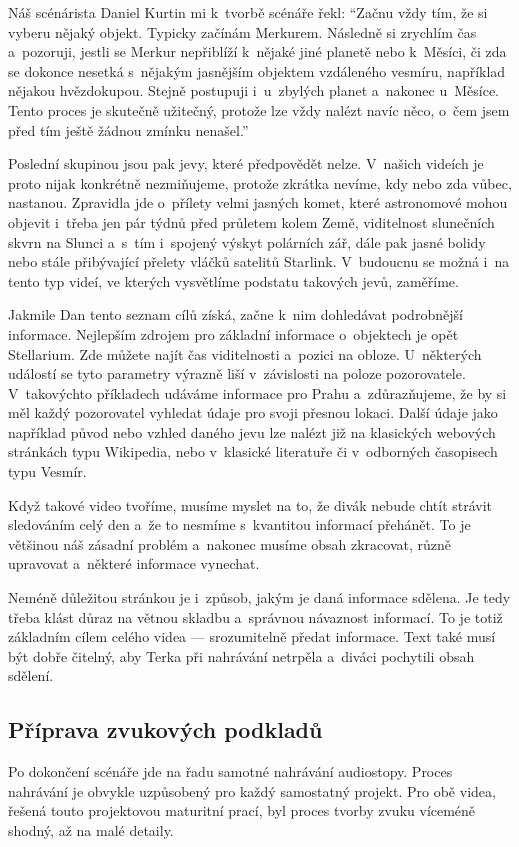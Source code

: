 \documentclass[12pt,a4paper,titlepage]{article}
\begin{document}
Náš scénárista Daniel Kurtin mi k~tvorbě scénáře řekl: \enquote{Začnu vždy tím, že si vyberu nějaký objekt. Typicky začínám Merkurem. Následně si zrychlím čas a~pozoruji, jestli se Merkur nepřiblíží k~nějaké jiné planetě nebo k~Měsíci, či zda se dokonce nesetká s~nějakým jasnějším objektem vzdáleného vesmíru, například nějakou hvězdokupou. Stejně postupuji i~u~zbylých planet a~nakonec u~Měsíce. Tento proces je skutečně užitečný, protože lze vždy nalézt navíc něco, o~čem jsem před tím ještě žádnou zmínku nenašel.}

Poslední skupinou jsou pak jevy, které předpovědět nelze. V~našich videích je proto nijak konkrétně nezmiňujeme, protože zkrátka nevíme, kdy nebo zda vůbec, nastanou. Zpravidla jde o~přílety velmi jasných komet, které astronomové mohou objevit i~třeba jen pár týdnů před průletem kolem Země,  viditelnost slunečních skvrn na Slunci a~s~tím i~spojený výskyt polárních zář, dále pak jasné bolidy nebo stále přibývající přelety vláčků satelitů Starlink. V~budoucnu se možná i~na tento typ videí, ve kterých vysvětlíme podstatu takových jevů, zaměříme. 

Jakmile Dan tento seznam cílů získá, začne k~nim dohledávat podrobnější informace. Nejlepším zdrojem pro základní informace o~objektech je opět Stellarium. Zde můžete najít čas viditelnosti a~pozici na obloze. U~některých událostí se tyto parametry výrazně liší v~závislosti na poloze pozorovatele. V~takovýchto příkladech udáváme informace pro Prahu a~zdůrazňujeme, že by si měl každý pozorovatel vyhledat údaje pro svoji přesnou lokaci. Další údaje jako například původ nebo vzhled daného jevu lze nalézt již na klasických webových stránkách typu Wikipedia, nebo v~klasické literatuře či v~odborných časopisech typu Vesmír.

Když takové video tvoříme, musíme myslet na to, že divák nebude chtít strávit sledováním celý den a~že to nesmíme s~kvantitou informací přehánět. To je většinou náš zásadní problém a~nakonec musíme obsah zkracovat, různě upravovat a~některé informace vynechat. 

Neméně důležitou stránkou je i~způsob, jakým je daná informace sdělena. Je tedy třeba klást důraz na větnou skladbu a~správnou návaznost informací. To je totiž základním cílem celého videa --- srozumitelně předat informace. Text také musí být dobře čitelný, aby Terka při nahrávání netrpěla a~diváci pochytili obsah sdělení.

\subsection{Příprava zvukových podkladů}\label{makingof:audio-prep}
Po dokončení scénáře jde na řadu samotné nahrávání audiostopy. Proces nahrávání je obvykle uzpůsobený pro každý samostatný projekt. Pro obě videa, řešená touto projektovou maturitní prací, byl proces tvorby zvuku víceméně shodný, až na malé detaily. 
\end{document}
